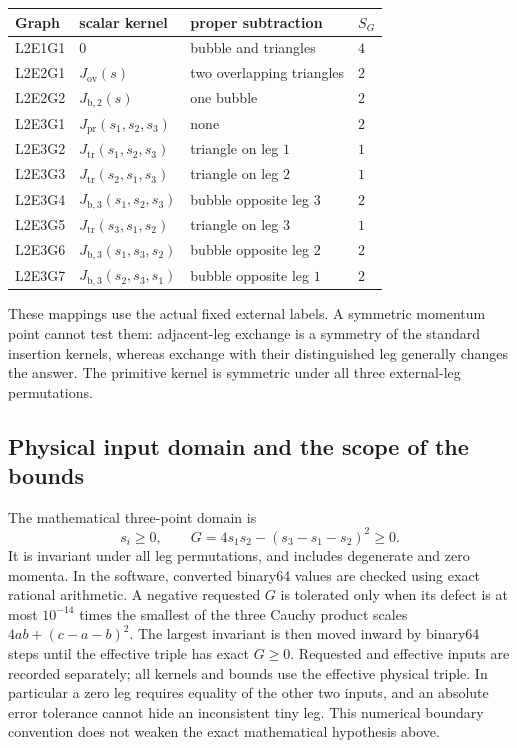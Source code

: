 \begin{center}
\small
\begin{tabular}{llll}
Graph & scalar kernel & proper subtraction & $S_G$\\ \hline
L2E1G1 & $0$ & bubble and triangles & $4$\\
L2E2G1 & $J_{\mathrm{ov}}(s)$ & two overlapping triangles & $2$\\
L2E2G2 & $J_{\mathrm{b},2}(s)$ & one bubble & $2$\\
L2E3G1 & $J_{\mathrm{pr}}(s_1,s_2,s_3)$ & none & $2$\\
L2E3G2 & $J_{\mathrm{tr}}(s_1,s_2,s_3)$ & triangle on leg $1$ & $1$\\
L2E3G3 & $J_{\mathrm{tr}}(s_2,s_1,s_3)$ & triangle on leg $2$ & $1$\\
L2E3G4 & $J_{\mathrm{b},3}(s_1,s_2,s_3)$ & bubble opposite leg $3$ & $2$\\
L2E3G5 & $J_{\mathrm{tr}}(s_3,s_1,s_2)$ & triangle on leg $3$ & $1$\\
L2E3G6 & $J_{\mathrm{b},3}(s_1,s_3,s_2)$ & bubble opposite leg $2$ & $2$\\
L2E3G7 & $J_{\mathrm{b},3}(s_2,s_3,s_1)$ & bubble opposite leg $1$ & $2$
\end{tabular}
\end{center}
These mappings use the actual fixed external labels. A symmetric momentum
point cannot test them: adjacent-leg exchange is a symmetry of the standard
insertion kernels, whereas exchange with their distinguished leg generally
changes the answer. The primitive kernel is symmetric under all three
external-leg permutations.

\subsection{Physical input domain and the scope of the bounds}

The mathematical three-point domain is
\[
 s_i\ge0,\qquad
 G=4s_1s_2-(s_3-s_1-s_2)^2\ge0.
\]
It is invariant under all leg permutations, and includes degenerate and
zero momenta. In the software, converted binary64 values are checked using
exact rational arithmetic. A negative requested $G$ is tolerated only when
its defect is at most $10^{-14}$ times the smallest of the three Cauchy
product scales $4ab+(c-a-b)^2$. The largest invariant is then moved inward
by binary64 steps until the effective triple has exact $G\ge0$. Requested
and effective inputs are recorded separately; all kernels and bounds use
the effective physical triple. In particular a zero leg requires equality
of the other two inputs, and an absolute error tolerance cannot hide an
inconsistent tiny leg. This numerical boundary convention does not weaken
the exact mathematical hypothesis above.

